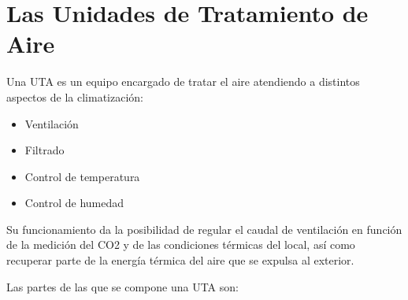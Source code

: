 
\cleardoublepage
\chapter{Las Unidades de Tratamiento de Aire}

\label{chap:anexoUTA} %

Una UTA es un equipo encargado de tratar el aire atendiendo a distintos aspectos de la climatización:

\begin{itemize}
    \item Ventilación
    \item Filtrado
    \item Control de temperatura
    \item Control de humedad
\end{itemize}

Su funcionamiento da la posibilidad de regular el caudal de ventilación en función de la medición del CO2 y de las condiciones térmicas del local, así como recuperar parte de la energía térmica del aire que se expulsa al exterior.

Las partes de las que se compone una UTA son:

